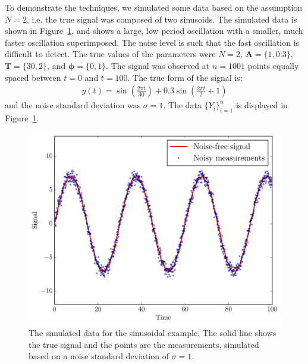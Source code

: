 \documentclass[letterpaper, 11pt]{article}
\begin{document}
To demonstrate the techniques,
we simulated some data based on the assumption $N=2$, i.e. the true signal was
composed of two sinusoids.
The simulated data is shown in Figure~\ref{fig:sinewave_data}, and shows a
large, low period oscillation with a smaller, much faster oscillation
superimposed. The noise level is such that the fast oscillation is difficult
to detect. The true values of the parameters were
$N=2$, $\mathbf{A} = \{1, 0.3\}$,
$\mathbf{T}=\{30, 2\}$, and $\boldsymbol{\phi} = \{0, 1\}$. The signal was
observed at $n=1001$ points equally spaced between $t=0$ and $t=100$.
The true form of the signal is:
\begin{eqnarray}
y(t) = \sin\left(\frac{2\pi t}{30}\right) +
0.3 \sin\left(\frac{2\pi t}{2} + 1\right)
\end{eqnarray}
and the noise standard deviation was $\sigma = 1$. The data $\{Y_i\}_{i=1}^n$
is displayed in Figure~\ref{fig:sinewave_data}.

\begin{figure}
\begin{center}
\includegraphics[scale=0.5]{sinewave_data.pdf}
\caption{The simulated data for the sinusoidal example. The solid line shows
the true signal and the points are the measurements, simulated based on a
noise standard deviation of $\sigma = 1$.
\label{fig:sinewave_data}}
\end{center}
\end{figure}
\end{document}
